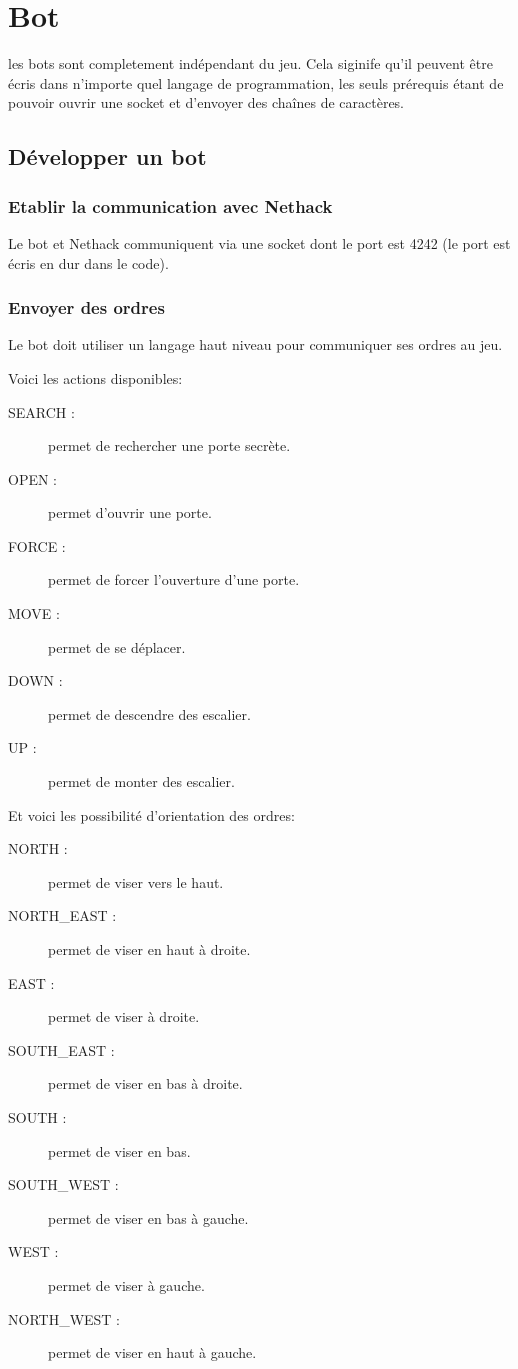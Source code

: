 \chapter{Bot}

les bots sont completement indépendant du jeu. Cela siginife qu'il peuvent être écris dans n'importe quel langage de programmation, les seuls prérequis étant de pouvoir ouvrir une socket et d'envoyer des chaînes de caractères.

\section{Développer un bot}

\subsection{Etablir la communication avec Nethack}
Le bot et Nethack communiquent via une socket dont le port est 4242 (le port est écris en dur dans le code).

\subsection{Envoyer des ordres}
Le bot doit utiliser un langage haut niveau pour communiquer ses ordres au jeu.


Voici les actions disponibles:

\begin{description}
\item[SEARCH :] permet de rechercher une porte secrète.
\item[OPEN :] permet d'ouvrir une porte.
\item[FORCE :] permet de forcer l'ouverture d'une porte.
\item[MOVE :] permet de se déplacer.
\item[DOWN :] permet de descendre des escalier. 
\item[UP :] permet de monter des escalier.
\end{description}

Et voici les possibilité d'orientation des ordres:

\begin{description}
\item[NORTH :] permet de viser vers le haut.
\item[NORTH\_EAST :] permet de viser en haut à droite.
\item[EAST :] permet de viser à droite.
\item[SOUTH\_EAST :] permet de viser en bas à droite.
\item[SOUTH :] permet de viser en bas.
\item[SOUTH\_WEST :] permet de viser en bas à gauche.
\item[WEST :] permet de viser à gauche.
\item[NORTH\_WEST :] permet de viser en haut à gauche.
\end{description}

